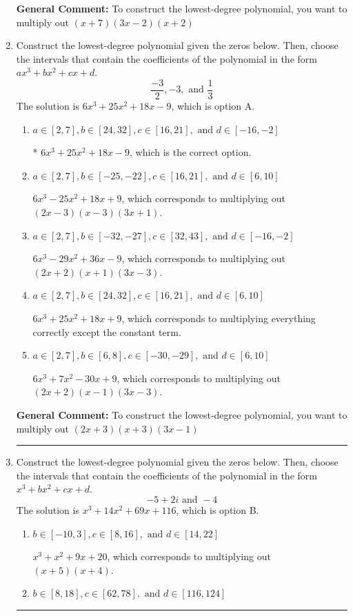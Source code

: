 \documentclass{extbook}[14pt]
\newcommand{\litem}[1]{\item #1

\rule{\textwidth}{0.4pt}}
\begin{document}
\begin{enumerate}
{\textbf{General Comment:} To construct the lowest-degree polynomial, you want to multiply out $(x + 7)(3x -2)(x + 2)$
}
\litem{
Construct the lowest-degree polynomial given the zeros below. Then, choose the intervals that contain the coefficients of the polynomial in the form $ax^3+bx^2+cx+d$.
\[ \frac{-3}{2}, -3, \text{ and } \frac{1}{3} \]
The solution is \( 6x^{3} +25 x^{2} +18 x -9 \), which is option A.\begin{enumerate}[label=\Alph*.]
\item \( a \in [2, 7], b \in [24, 32], c \in [16, 21], \text{ and } d \in [-16, -2] \)

* $6x^{3} +25 x^{2} +18 x -9$, which is the correct option.
\item \( a \in [2, 7], b \in [-25, -22], c \in [16, 21], \text{ and } d \in [6, 10] \)

$6x^{3} -25 x^{2} +18 x + 9$, which corresponds to multiplying out $(2x -3)(x -3)(3x + 1)$.
\item \( a \in [2, 7], b \in [-32, -27], c \in [32, 43], \text{ and } d \in [-16, -2] \)

$6x^{3} -29 x^{2} +36 x -9$, which corresponds to multiplying out $(2x + 2)(x + 1)(3x -3)$.
\item \( a \in [2, 7], b \in [24, 32], c \in [16, 21], \text{ and } d \in [6, 10] \)

$6x^{3} +25 x^{2} +18 x + 9$, which corresponds to multiplying everything correctly except the constant term.
\item \( a \in [2, 7], b \in [6, 8], c \in [-30, -29], \text{ and } d \in [6, 10] \)

$6x^{3} +7 x^{2} -30 x + 9$, which corresponds to multiplying out $(2x + 2)(x -1)(3x -3)$.
\end{enumerate}

\textbf{General Comment:} To construct the lowest-degree polynomial, you want to multiply out $(2x + 3)(x + 3)(3x -1)$
}
\litem{
Construct the lowest-degree polynomial given the zeros below. Then, choose the intervals that contain the coefficients of the polynomial in the form $x^3+bx^2+cx+d$.
\[ -5 + 2 i \text{ and } -4 \]
The solution is \( x^{3} +14 x^{2} +69 x + 116 \), which is option B.\begin{enumerate}[label=\Alph*.]
\item \( b \in [-10, 3], c \in [8, 16], \text{ and } d \in [14, 22] \)

$x^{3} + x^{2} +9 x + 20$, which corresponds to multiplying out $(x + 5)(x + 4)$.
\item \( b \in [8, 18], c \in [62, 78], \text{ and } d \in [116, 124] \)


\end{enumerate}}
\end{enumerate}
\end{document}
